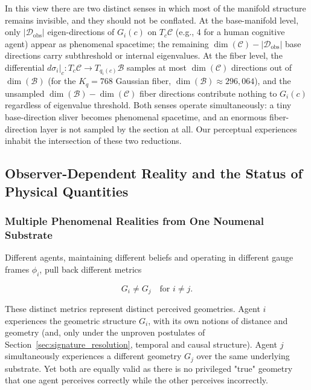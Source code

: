 \documentclass[11pt]{article}
\begin{document}
In this view there are two distinct senses in which most of the manifold structure remains invisible, and they should not be conflated. At the base-manifold level, only $|\mathcal{D}_{\text{obs}}|$ eigen-directions of $G_i(c)$ on $T_c\mathcal{C}$ (e.g., 4 for a human cognitive agent) appear as phenomenal spacetime; the remaining $\dim(\mathcal{C}) - |\mathcal{D}_{\text{obs}}|$ base directions carry subthreshold or internal eigenvalues. At the fiber level, the differential $d\sigma_i|_c: T_c\mathcal{C} \to T_{q_i(c)}\mathcal{B}$ samples at most $\dim(\mathcal{C})$ directions out of $\dim(\mathcal{B})$ (for the $K_q = 768$ Gaussian fiber, $\dim(\mathcal{B}) \approx 296{,}064$), and the unsampled $\dim(\mathcal{B}) - \dim(\mathcal{C})$ fiber directions contribute nothing to $G_i(c)$ regardless of eigenvalue threshold. Both senses operate simultaneously: a tiny base-direction sliver becomes phenomenal spacetime, and an enormous fiber-direction layer is not sampled by the section at all. Our perceptual experiences inhabit the intersection of these two reductions.

\subsection{Observer-Dependent Reality and the Status of Physical Quantities}
\label{sec:observer}

\subsubsection{Multiple Phenomenal Realities from One Noumenal Substrate}

Different agents, maintaining different beliefs and operating in different gauge frames $\phi_i$, pull back different metrics

\begin{equation}
G_i \neq G_j \quad \text{for } i \neq j.
\end{equation}

These distinct metrics represent distinct perceived geometries. Agent $i$ experiences the geometric structure $G_i$, with its own notions of distance and geometry (and, only under the unproven postulates of Section~\ref{sec:signature_resolution}, temporal and causal structure). Agent $j$ simultaneously experiences a different geometry $G_j$ over the same underlying substrate. Yet both are equally valid as there is no privileged "true" geometry that one agent perceives correctly while the other perceives incorrectly.
\end{document}
